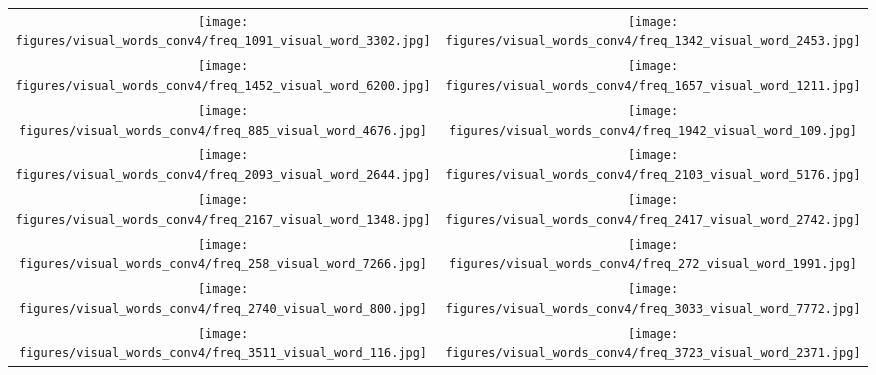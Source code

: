 \documentclass[final]{cvpr}
\newcommand{\resnetfifty}{ResNet50\xspace}
\begin{document}
\begin{figure*}
\begin{tabular}{cc}
    \end{tabular}
    \vspace{-8pt}
    \caption{\textbf{Examples of visual-word members from the \texttt{conv5} layer of \resnetfifty.} 
    The visualizations are created by using the state of the queue-based visual-words vocabulary at the end of training. 
    For each visual word, we depict the 8 image patches retrieved from ImageNet with the highest assignment score for that word.
    }
    \label{fig:visual_words_conv5}
\end{figure*}

\begin{figure*}
    \centering
    \begin{tabular}{cc}
    \texttt{[image: figures/visual\_words\_conv4/freq\_1091\_visual\_word\_3302.jpg]} & \texttt{[image: figures/visual\_words\_conv4/freq\_1342\_visual\_word\_2453.jpg]} \\
    \texttt{[image: figures/visual\_words\_conv4/freq\_1452\_visual\_word\_6200.jpg]} & \texttt{[image: figures/visual\_words\_conv4/freq\_1657\_visual\_word\_1211.jpg]} \\  
    \texttt{[image: figures/visual\_words\_conv4/freq\_885\_visual\_word\_4676.jpg]} & \texttt{[image: figures/visual\_words\_conv4/freq\_1942\_visual\_word\_109.jpg]} \\
    \texttt{[image: figures/visual\_words\_conv4/freq\_2093\_visual\_word\_2644.jpg]} & \texttt{[image: figures/visual\_words\_conv4/freq\_2103\_visual\_word\_5176.jpg]} \\  
    \texttt{[image: figures/visual\_words\_conv4/freq\_2167\_visual\_word\_1348.jpg]} & \texttt{[image: figures/visual\_words\_conv4/freq\_2417\_visual\_word\_2742.jpg]} \\ 
    \texttt{[image: figures/visual\_words\_conv4/freq\_258\_visual\_word\_7266.jpg]} & \texttt{[image: figures/visual\_words\_conv4/freq\_272\_visual\_word\_1991.jpg]} \\ 
    \texttt{[image: figures/visual\_words\_conv4/freq\_2740\_visual\_word\_800.jpg]} & \texttt{[image: figures/visual\_words\_conv4/freq\_3033\_visual\_word\_7772.jpg]} \\  
    \texttt{[image: figures/visual\_words\_conv4/freq\_3511\_visual\_word\_116.jpg]} & \texttt{[image: figures/visual\_words\_conv4/freq\_3723\_visual\_word\_2371.jpg]} \\

\end{tabular}
\end{figure*}
\end{document}
